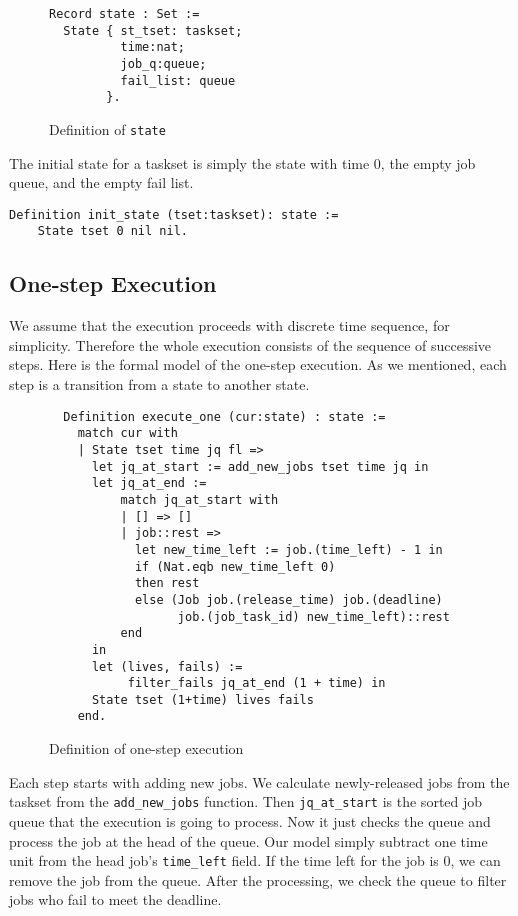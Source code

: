 \documentclass[nocopyrightspace]{sigplanconf}
\begin{document}
\begin{figure}[H]
\begin{verbatim}
Record state : Set :=
  State { st_tset: taskset;
          time:nat;
          job_q:queue;
          fail_list: queue
        }.
\end{verbatim}
\caption{ Definition of \texttt{state} }\label{fig:state}
\end{figure}

The initial state for a taskset is simply the state with time 0, the empty job queue, and the empty fail list.
\begin{verbatim}
Definition init_state (tset:taskset): state :=
    State tset 0 nil nil.
\end{verbatim}

\subsection{One-step Execution}
We assume that the execution proceeds with discrete time sequence, for simplicity. Therefore the whole execution consists of
the sequence of successive steps. Here is the formal model of the one-step execution. As we mentioned, each step is a
transition from a state to another state.

\begin{figure}[H]
\begin{verbatim}
  Definition execute_one (cur:state) : state :=
    match cur with
    | State tset time jq fl =>
      let jq_at_start := add_new_jobs tset time jq in
      let jq_at_end :=
          match jq_at_start with
          | [] => []
          | job::rest =>
            let new_time_left := job.(time_left) - 1 in
            if (Nat.eqb new_time_left 0)
            then rest
            else (Job job.(release_time) job.(deadline)
                  job.(job_task_id) new_time_left)::rest
          end
      in
      let (lives, fails) :=
           filter_fails jq_at_end (1 + time) in
      State tset (1+time) lives fails
    end.
\end{verbatim}
\caption{ Definition of one-step execution }\label{fig:one-step}
\end{figure}

Each step starts with adding new jobs. We calculate newly-released jobs from the taskset from the \texttt{add\_new\_jobs} function. Then \texttt{jq\_at\_start} is the sorted job queue that the execution is going to process. Now it just checks the queue and process the job at the head of the queue. Our model simply subtract one time unit from the head job's \texttt{time\_left} field. If the time left for the job is 0, we can remove the job from the queue. After the processing, we check the queue to filter jobs who fail to meet the deadline.
\end{document}
